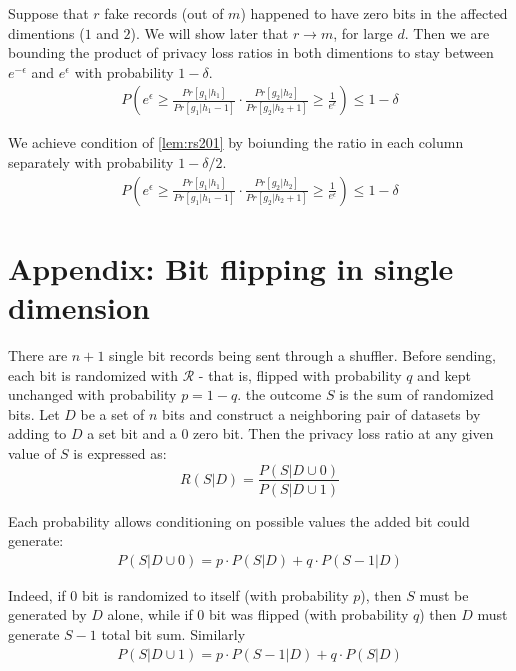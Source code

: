 \documentclass[11pt]{article}
\newcommand{\cR}{\mathcal{R}}
\begin{document}
Suppose that $r$ fake records (out of $m$) happened to have zero bits in the affected dimentions ($1$ and $2$).  We will show later that $r \to m$,  for  large $d$.  Then we are bounding the product of privacy loss ratios in both dimentions to stay between $e^{-\epsilon}$ and $e^\epsilon$ with probability $1-\delta$.
\begin{align} \label{lem:fk101}
P \left (   e^\epsilon \ge \frac{  Pr[ g_1 | h_1]  } {  Pr[ g_1 | h_1 - 1]  } \cdot \frac{  Pr[ g_2 | h_2]  } {  Pr[ g_2 | h_2 + 1]  }  \ge \frac{1}{e^\epsilon} \right ) \le 1 - \delta
\end{align}

We achieve condition of \eqref{lem:rs201} by boiunding the ratio in each column separately with probability $1-\delta/2$.
\begin{align} \label{lem:fk101}
P \left (   e^\epsilon \ge \frac{  Pr[ g_1 | h_1]  } {  Pr[ g_1 | h_1 - 1]  } \cdot \frac{  Pr[ g_2 | h_2]  } {  Pr[ g_2 | h_2 + 1]  }  \ge \frac{1}{e^\epsilon} \right ) \le 1 - \delta
\end{align}



\section{Appendix: Bit flipping in single dimension}


There are $n+1$ single bit records being sent through a shuffler.  Before sending, each bit is randomized with $\cR$ - that is, flipped with probability $q$  and kept unchanged with probability $p=1-q$.  the outcome $S$ is the sum of randomized bits. Let $D$ be a set of $n$ bits and construct a neighboring pair of datasets by adding to $D$ a set bit and a 0 zero bit.  Then the privacy loss ratio at any given value of $S$ is expressed as:
\begin{equation} \label{eq:} 
R(S|D)= \frac{P(S|D \cup 0)}{P(S|D \cup 1)}
\end{equation}

Each probability allows conditioning on possible values the added bit could generate:
\begin{align}\label{lem:rs100}
P(S|D \cup 0) = p \cdot P(S | D ) + q \cdot P( S - 1 | D) 
\end{align}

Indeed, if $0$ bit is randomized to itself (with probability $p$), then $S$ must be generated by $D$ alone, while if $0$ bit was flipped (with probability $q$) then $D$ must generate $S-1$ total bit sum. Similarly 
\begin{align}
P(S|D \cup 1) = p  \cdot P(S -1 | D ) + q \cdot P( S  | D) 
\end{align}
\end{document}
